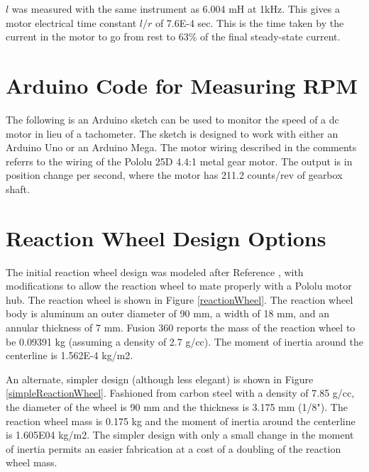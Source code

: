 \documentclass[12pt,letterpaper]{article}
\begin{document}
\begin{appendices}
$l$ was 
measured with the same instrument as 6.004 mH at 1kHz.  This gives a motor electrical time constant $l/r$ of 7.6E-4 sec.  This is the time taken by the current in the motor to go from rest to 63\% of the final steady-state current.\\



\section{Arduino Code for Measuring RPM}

The following is an Arduino sketch can be used to monitor the speed of a dc motor in lieu of a tachometer.  The sketch is designed
to work with either an Arduino Uno or an Arduino Mega. The motor wiring described in the comments
referrs to the wiring of the Pololu 25D 4.4:1 metal gear motor.  The output is in position change 
per second, where the motor has 211.2 counts/rev of gearbox shaft. \\



\section{Reaction Wheel Design Options}

The initial reaction wheel design was modeled after Reference \cite{hackaday}, with modifications to allow the reaction wheel
to mate properly with a Pololu motor hub.  The reaction wheel is shown in Figure \ref{reactionWheel}.
The reaction wheel body is aluminum an outer diameter of 90 mm, a width of 18 mm, and an annular thickness of 7 mm. 
Fusion 360 reports the mass of the reaction wheel to be 0.09391 kg (assuming a density of 2.7 g/cc).
The moment of inertia around the centerline is 1.562E-4 kg/m2.

An alternate, simpler design (although less elegant) is shown in Figure \ref{simpleReactionWheel}.
Fashioned from carbon steel with a density of  7.85 g/cc, the diameter of the wheel is 90 mm and the
thickness is 3.175 mm (1/8").  The reaction wheel mass is 0.175 kg and the moment of inertia 
around the centerline is 1.605E04 kg/m2.  The simpler design with only a small change in the moment
of inertia permits an easier fabrication at a cost of a doubling of the reaction wheel mass.





\end{appendices}
\end{document}
